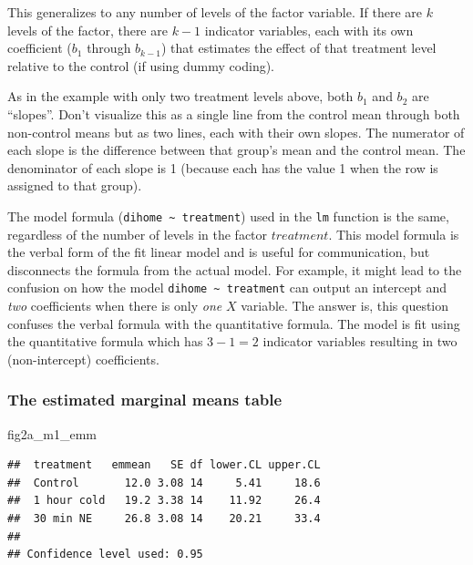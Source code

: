 \documentclass[]{book}
\newenvironment{Shaded}{\begin{snugshade}}{\end{snugshade}}
\newcommand{\NormalTok}[1]{#1}
\begin{document}
This generalizes to any number of levels of the factor variable. If there are \(k\) levels of the factor, there are \(k-1\) indicator variables, each with its own coefficient (\(b_1\) through \(b_{k-1}\)) that estimates the effect of that treatment level relative to the control (if using dummy coding).

As in the example with only two treatment levels above, both \(b_1\) and \(b_2\) are ``slopes''. Don't visualize this as a single line from the control mean through both non-control means but as two lines, each with their own slopes. The numerator of each slope is the difference between that group's mean and the control mean. The denominator of each slope is 1 (because each has the value 1 when the row is assigned to that group).

The model formula (\texttt{dihome\ \textasciitilde{}\ treatment}) used in the \texttt{lm} function is the same, regardless of the number of levels in the factor \(treatment\). This model formula is the verbal form of the fit linear model and is useful for communication, but disconnects the formula from the actual model. For example, it might lead to the confusion on how the model \texttt{dihome\ \textasciitilde{}\ treatment} can output an intercept and \emph{two} coefficients when there is only \emph{one} \(X\) variable. The answer is, this question confuses the verbal formula with the quantitative formula. The model is fit using the quantitative formula which has \(3-1=2\) indicator variables resulting in two (non-intercept) coefficients.

\hypertarget{the-estimated-marginal-means-table}{%
\subsubsection{The estimated marginal means table}\label{the-estimated-marginal-means-table}}

\begin{Shaded}
\begin{Highlighting}[]
\NormalTok{fig2a_m1_emm}
\end{Highlighting}
\end{Shaded}

\begin{verbatim}
##  treatment   emmean   SE df lower.CL upper.CL
##  Control       12.0 3.08 14     5.41     18.6
##  1 hour cold   19.2 3.38 14    11.92     26.4
##  30 min NE     26.8 3.08 14    20.21     33.4
## 
## Confidence level used: 0.95
\end{verbatim}
\end{document}
